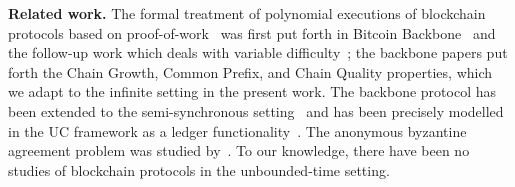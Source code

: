 \noindent
\textbf{Related work.}
The formal treatment of polynomial executions of blockchain protocols based on
proof-of-work~\cite{C:DwoNao92} was first put forth in Bitcoin
Backbone~\cite{EC:GarKiaLeo15} and the follow-up work which deals with variable
difficulty~\cite{C:GarKiaLeo17}; the backbone papers put forth the Chain Growth, Common Prefix,
and Chain Quality properties, which we adapt to the infinite setting in
the present work. The backbone protocol has been extended to the
semi-synchronous setting~\cite{EC:PasSeeShe17} and has been precisely modelled
in the UC framework as a ledger
functionality~\cite{EPRINT:BMTZ17,badertscher2018ouroboros}. The anonymous
byzantine agreement problem was studied by~\cite{okun2008efficient}. To our
knowledge, there have been no studies of blockchain protocols in the
unbounded-time setting.
